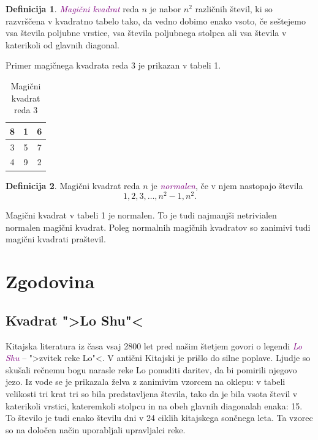 \documentclass[a4paper,12pt]{article}
\theoremstyle{definition}
\newtheorem{definicija}{Definicija}
\theoremstyle{plain}
\newcommand{\pojem}[1]{\textcolor{purple}{\emph{#1}}}
\begin{document}
\begin{definicija}
   \pojem{Magični kvadrat} reda $n$ je nabor $n^2$ različnih števil,
   ki so razvrščena v kvadratno tabelo tako, da vedno dobimo enako vsoto,
   če seštejemo vsa števila poljubne vrstice, vsa števila poljubnega
   stolpca ali vsa števila v katerikoli od glavnih diagonal.
\end{definicija}

Primer magičnega kvadrata reda 3 je prikazan v tabeli 1.

\begin{table}[!ht]
   \centering
   \caption{Magični kvadrat reda 3}
   \label{table:mag3}
   \begin{tabular}{|c|c|c|}
       \hline
       8 & 1 & 6 \\\hline
       3 & 5 & 7 \\\hline
       4 & 9 & 2 \\\hline
   \end{tabular}
\end{table}

\begin{definicija}
   Magični kvadrat reda $n$ je \pojem{normalen}, če v njem nastopajo števila
   \begin{equation}
      \label{eq:numbers}
      1, 2, 3, \ldots, n^2-1, n^2.
   \end{equation}
\end{definicija}

Magični kvadrat v tabeli 1 je normalen.
To je tudi najmanjši netrivialen normalen magični kvadrat.
Poleg normalnih magičnih kvadratov so zanimivi tudi magični kvadrati praštevil.


\section{Zgodovina}

\subsection{Kvadrat ">Lo Shu"<}

Kitajska literatura iz časa vsaj 2800 let pred našim štetjem govori o legendi
\pojem{Lo Shu} -- ">zvitek reke Lo"<. V antični Kitajski je prišlo do
silne poplave. Ljudje so skušali rečnemu bogu narasle reke Lo ponuditi daritev,
da bi pomirili njegovo jezo. Iz vode se je prikazala želva z zanimivim vzorcem
na oklepu: v tabeli velikosti tri krat tri so bila predstavljena števila, tako
da je bila vsota števil v katerikoli vrstici, kateremkoli stolpcu in na obeh
glavnih diagonalah enaka: 15. To število je tudi enako številu dni v 24 ciklih
kitajskega sončnega leta. Ta vzorec so na določen način uporabljali upravljalci
reke.
\end{document}
